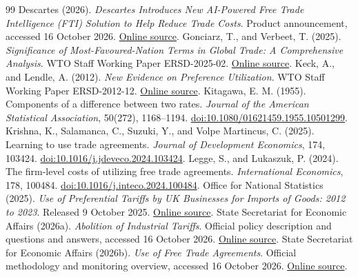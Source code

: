 \documentclass[11pt,a4paper]{article}
\begin{document}
\begin{thebibliography}{99}
 Descartes (2026). \emph{Descartes Introduces New AI-Powered Free Trade Intelligence (FTI) Solution to Help Reduce Trade Costs}. Product announcement, accessed 16 October 2026. \href{https://www.descartes.com/resources/news/descartes-introduces-new-ai-powered-free-trade-intelligence-fti-solution-help-reduce?language=en}{Online source}.
 Gonciarz, T., and Verbeet, T. (2025). \emph{Significance of Most-Favoured-Nation Terms in Global Trade: A Comprehensive Analysis}. WTO Staff Working Paper ERSD-2025-02. \href{https://www.wto.org/english/res_e/reser_e/ersd202502_e.pdf}{Online source}.
 Keck, A., and Lendle, A. (2012). \emph{New Evidence on Preference Utilization}. WTO Staff Working Paper ERSD-2012-12. \href{https://www.wto.org/english/res_e/reser_e/ersd201212_e.pdf}{Online source}.
 Kitagawa, E. M. (1955). Components of a difference between two rates. \emph{Journal of the American Statistical Association}, 50(272), 1168--1194. \href{https://doi.org/10.1080/01621459.1955.10501299}{doi:10.1080/01621459.1955.10501299}.
 Krishna, K., Salamanca, C., Suzuki, Y., and Volpe Martincus, C. (2025). Learning to use trade agreements. \emph{Journal of Development Economics}, 174, 103424. \href{https://doi.org/10.1016/j.jdeveco.2024.103424}{doi:10.1016/j.jdeveco.2024.103424}.
 Legge, S., and Lukaszuk, P. (2024). The firm-level costs of utilizing free trade agreements. \emph{International Economics}, 178, 100484. \href{https://doi.org/10.1016/j.inteco.2024.100484}{doi:10.1016/j.inteco.2024.100484}.
 Office for National Statistics (2025). \emph{Use of Preferential Tariffs by UK Businesses for Imports of Goods: 2012 to 2023}. Released 9 October 2025. \href{https://www.ons.gov.uk/businessindustryandtrade/internationaltrade/articles/useofpreferentialtariffsbyukbusinessesforimportsofgoods/2012to2023}{Online source}.
 State Secretariat for Economic Affairs (2026a). \emph{Abolition of Industrial Tariffs}. Official policy description and questions and answers, accessed 16 October 2026. \href{https://www.seco.admin.ch/en/industrial-tariffs-abolition}{Online source}.
 State Secretariat for Economic Affairs (2026b). \emph{Use of Free Trade Agreements}. Official methodology and monitoring overview, accessed 16 October 2026. \href{https://www.seco.admin.ch/en/use-of-free-trade-agreements}{Online source}.

\end{thebibliography}
\end{document}
